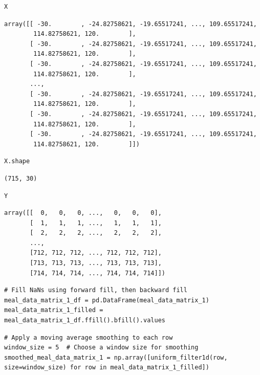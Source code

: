 \begin{verbatim}
X
\end{verbatim}

\begin{verbatim}
array([[ -30.        , -24.82758621, -19.65517241, ..., 109.65517241,
        114.82758621, 120.        ],
       [ -30.        , -24.82758621, -19.65517241, ..., 109.65517241,
        114.82758621, 120.        ],
       [ -30.        , -24.82758621, -19.65517241, ..., 109.65517241,
        114.82758621, 120.        ],
       ...,
       [ -30.        , -24.82758621, -19.65517241, ..., 109.65517241,
        114.82758621, 120.        ],
       [ -30.        , -24.82758621, -19.65517241, ..., 109.65517241,
        114.82758621, 120.        ],
       [ -30.        , -24.82758621, -19.65517241, ..., 109.65517241,
        114.82758621, 120.        ]])
\end{verbatim}

\begin{verbatim}
X.shape
\end{verbatim}

\begin{verbatim}
(715, 30)
\end{verbatim}

\begin{verbatim}
Y
\end{verbatim}

\begin{verbatim}
array([[  0,   0,   0, ...,   0,   0,   0],
       [  1,   1,   1, ...,   1,   1,   1],
       [  2,   2,   2, ...,   2,   2,   2],
       ...,
       [712, 712, 712, ..., 712, 712, 712],
       [713, 713, 713, ..., 713, 713, 713],
       [714, 714, 714, ..., 714, 714, 714]])
\end{verbatim}

\begin{verbatim}
# Fill NaNs using forward fill, then backward fill
meal_data_matrix_1_df = pd.DataFrame(meal_data_matrix_1)
meal_data_matrix_1_filled = meal_data_matrix_1_df.ffill().bfill().values
\end{verbatim}

\begin{verbatim}
# Apply a moving average smoothing to each row
window_size = 5  # Choose a window size for smoothing
smoothed_meal_data_matrix_1 = np.array([uniform_filter1d(row, size=window_size) for row in meal_data_matrix_1_filled])
\end{verbatim}

